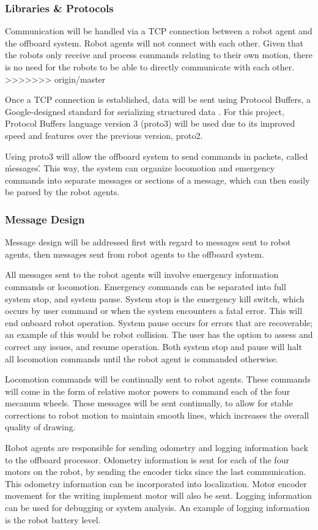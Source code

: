 \subsubsection{Libraries \& Protocols}
\label{sec:software_comm_libs}
Communication will be handled via a TCP connection between a robot agent and the offboard system. Robot agents will not connect with each other. Given that the robots only receive and process commands relating to their own motion, there is no need for the robots to be able to directly communicate with each other.
>>>>>>> origin/master

Once a TCP connection is established, data will be sent using Protocol Buffers, a Google-designed standard for serializing structured data \cite{protobuf3}. For this project, Protocol Buffers language version 3 (proto3) will be used due to its improved speed and features over the previous version, proto2.

Using proto3 will allow the offboard system to send commands in packets, called \'messages\'. This way, the system can organize locomotion and emergency commands into separate messages or sections of a message, which can then easily be parsed by the robot agents.

\subsubsection{Message Design}
\label{sec:software_comm_msg}
Message design will be addressed first with regard to messages sent to robot agents, then messages sent from robot agents to the offboard system.

All messages sent to the robot agents will involve emergency information commands or locomotion. Emergency commands can be separated into full system stop, and system pause. System stop is the emergency kill switch, which occurs by user command or when the system encounters a fatal error. This will end onboard robot operation. System pause occurs for errors that are recoverable; an example of this would be robot collision. The user has the option to assess and correct any issues, and resume operation. Both system stop and pause will halt all locomotion commands until the robot agent is commanded otherwise.

Locomotion commands will be continually sent to robot agents. These commands will come in the form of relative motor powers to command each of the four mecanum wheels. These messages will be sent continually, to allow for stable corrections to robot motion to maintain smooth lines, which increases the overall quality of drawing.

Robot agents are responsible for sending odometry and logging information back to the offboard processor. Odometry information is sent for each of the four motors on the robot, by sending the encoder ticks since the last communication. This odometry information can be incorporated into localization. Motor encoder movement for the writing implement motor will also be sent. Logging information can be used for debugging or system analysis. An example of logging information is the robot battery level.

